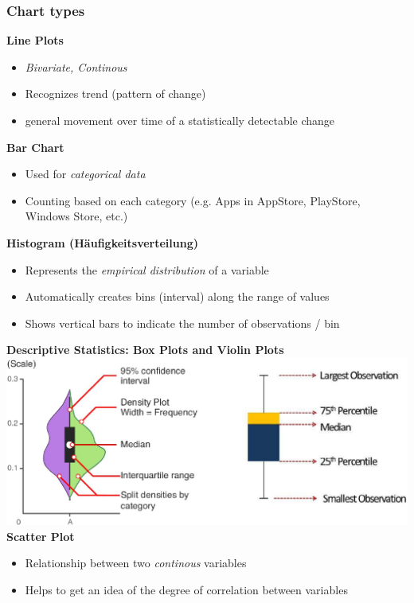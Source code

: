 \subsubsection{Chart types}
\textbf{Line Plots}
\begin{itemize}
    \item \textit{Bivariate, Continous}
    \item Recognizes trend (pattern of change)
    \item general movement over time of a statistically detectable change
\end{itemize}
\textbf{Bar Chart}
\begin{itemize}
    \item Used for \textit{categorical data}
    \item Counting based on each category (e.g. Apps in AppStore, PlayStore, Windows Store, etc.)
\end{itemize}
\textbf{Histogram (Häufigkeitsverteilung)}
\begin{itemize}
    \item Represents the \textit{empirical distribution} of a variable
    \item Automatically creates bins (interval) along the range of values
    \item Shows vertical bars to indicate the number of observations / bin
\end{itemize}
\textbf{Descriptive Statistics: Box Plots and Violin Plots}\\
\includegraphics[width=\linewidth]{./img/descriptive_statistics.png}
\textbf{Scatter Plot}
\begin{itemize}
    \item Relationship between two \textit{continous} variables
    \item Helps to get an idea of the degree of correlation between variables
\end{itemize}